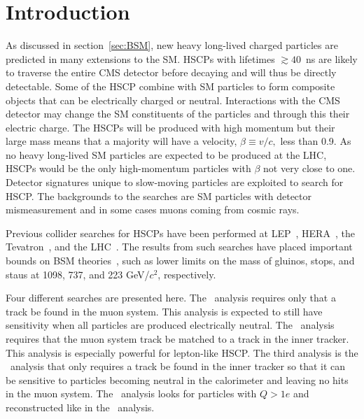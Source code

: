 \section{Introduction}
As discussed in section~\ref{sec:BSM}, new heavy long-lived charged particles are predicted in many extensions to the SM. HSCPs with
lifetimes $\gtrsim 40$~ns are likely to traverse the entire CMS detector before decaying and will thus be directly detectable.
Some of the HSCP combine with SM particles to form composite objects that can be electrically charged or neutral.
Interactions with the CMS detector may change the SM constituents of the particles and through this their electric charge.
The HSCPs will be produced with high momentum but their large mass means that
a majority will have a velocity, $\beta \equiv v/c,$ less than 0.9. 
As no heavy long-lived SM particles are expected to be produced at the LHC, HSCPs would be the only high-momentum particles with $\beta$ not very close to one.
Detector signatures unique to slow-moving particles are exploited to search for HSCP. 
The backgrounds to the searches are SM particles with detector mismeasurement and in some cases
muons coming from cosmic rays.

Previous collider searches for HSCPs have been performed at LEP~\cite{Barate:1997dr, Abreu:2000tn, Achard:2001qw, Abbiendi:2003yd}, HERA~\cite{Aktas:2004pq},
the Tevatron~\cite{Abazov:2008qu, Aaltonen:2009kea, Abazov:2011pf,Abazov:2012ab},
and the LHC~\cite{Khachatryan:2011ts, Aad:2011mb,  Aad:2011yf, Aad:2011hz, Chatrchyan::2012dr, Chatrchyan:2012sp, Aad:2012vd, ATLASmCHAMPs}.
The results from such searches have placed important bounds on BSM theories~\cite{Berger:2008cq, CahillRowley:2012kx}, such as lower limits on the
mass of gluinos, stops, and staus at 1098,
737, and 223 GeV/$c^2$, respectively.

Four different searches are presented here. The \muononly\ analysis requires only that a track be found in the muon system.
This analysis is expected to still have sensitivity when all particles are produced electrically neutral. The
\tktof\ analysis requires that the muon system track be matched to a track in the inner tracker. This analysis is especially
powerful for lepton-like HSCP. The third analysis is the \tkonly\ analysis that only requires a track be found in the inner tracker so that it can be sensitive to particles
becoming neutral in the calorimeter and leaving no hits in the muon system. The \multi\ analysis looks 
for particles with $Q > 1e$ and reconstructed like in the \tktof\ analysis.


